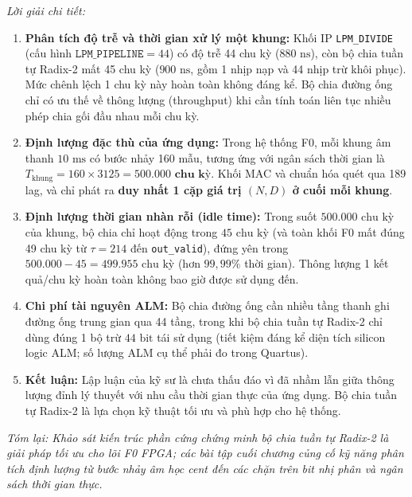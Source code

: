 \emph{Lời giải chi tiết:}
\begin{enumerate}[leftmargin=1.5em, itemsep=2pt]
    \item \textbf{Phân tích độ trễ và thời gian xử lý một khung:}
    Khối IP \texttt{LPM\_DIVIDE} (cấu hình $\texttt{LPM\_PIPELINE} = 44$) có độ trễ 44 chu kỳ ($880\text{ ns}$), còn bộ chia tuần tự Radix-2 mất 45 chu kỳ ($900\text{ ns}$, gồm 1 nhịp nạp và 44 nhịp trừ khôi phục). Mức chênh lệch 1 chu kỳ này hoàn toàn không đáng kể. Bộ chia đường ống chỉ có ưu thế về thông lượng (throughput) khi cần tính toán liên tục nhiều phép chia gối đầu nhau mỗi chu kỳ.
    \item \textbf{Định lượng đặc thù của ứng dụng:}
    Trong hệ thống F0, mỗi khung âm thanh $10\text{ ms}$ có bước nhảy 160 mẫu, tương ứng với ngân sách thời gian là $T_{\text{khung}} = 160 \times 3125 = \mathbf{500.000\text{ chu kỳ}}$. Khối MAC và chuẩn hóa quét qua 189 lag, và chỉ phát ra \textbf{duy nhất 1 cặp giá trị $(N, D)$ ở cuối mỗi khung}.
    \item \textbf{Định lượng thời gian nhàn rỗi (idle time):}
    Trong suốt $500.000\text{ chu kỳ}$ của khung, bộ chia chỉ hoạt động trong $45\text{ chu kỳ}$ (và toàn khối F0 mất đúng 49 chu kỳ từ $\tau = 214$ đến \texttt{out\_valid}), đứng yên trong $500.000 - 45 = 499.955\text{ chu kỳ}$ (hơn $99{,}99\%$ thời gian). Thông lượng 1 kết quả/chu kỳ hoàn toàn không bao giờ được sử dụng đến.
    \item \textbf{Chi phí tài nguyên ALM:}
    Bộ chia đường ống cần nhiều tầng thanh ghi đường ống trung gian qua 44 tầng, trong khi bộ chia tuần tự Radix-2 chỉ dùng đúng 1 bộ trừ $44\text{ bit}$ tái sử dụng (tiết kiệm đáng kể diện tích silicon logic ALM; số lượng ALM cụ thể phải đo trong Quartus). 
    \item \textbf{Kết luận:} Lập luận của kỹ sư là chưa thấu đáo vì đã nhầm lẫn giữa thông lượng đỉnh lý thuyết với nhu cầu thời gian thực của ứng dụng. Bộ chia tuần tự Radix-2 là lựa chọn kỹ thuật tối ưu và phù hợp cho hệ thống.
\end{enumerate}

\textit{Tóm lại: Khảo sát kiến trúc phần cứng chứng minh bộ chia tuần tự Radix-2 là giải pháp tối ưu cho lõi F0 FPGA; các bài tập cuối chương củng cố kỹ năng phân tích định lượng từ bước nhảy âm học cent đến các chặn trên bit nhị phân và ngân sách thời gian thực.}







